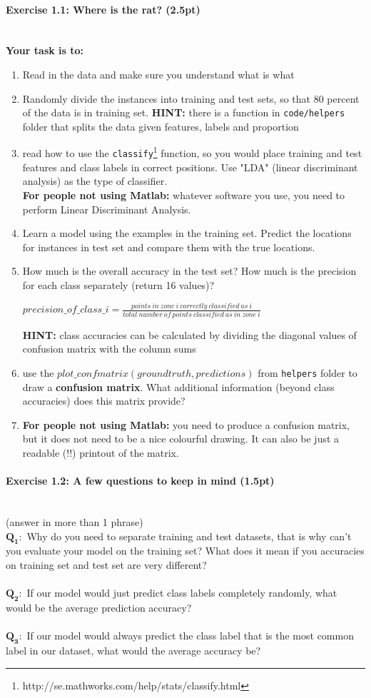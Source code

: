 \documentclass[a4paper,11pt]{article}
\newenvironment{exercise}[3]{\paragraph{Exercise #1: #2 (#3pt)}\ \\}{
\medskip}
\newcommand{\question}[2]{\setlength\parindent{0mm}\ \\$\mathbf{Q_#1:}$ #2\ \\}
\begin{document}
\begin{exercise}{1.1}{Where is the rat?}{2.5}
\textbf{Your task is to:}
\begin{enumerate}
\item Read in the data and make sure you understand what is what
\item Randomly divide the instances into training and test sets, so that 80 percent of the data is in training set. \textbf{HINT:} there is a function in \texttt{code/helpers} folder that splits the data given features, labels and proportion
\item read how to use the \texttt{classify}\footnote{http://se.mathworks.com/help/stats/classify.html} function, so you would place training and test features and class labels in correct positions. Use "LDA" (linear discriminant analysis) as the type of classifier.\\
\textbf{For people not using Matlab:} whatever software you use, you need to perform Linear Discriminant Analysis.
\item Learn a model using the examples in the training set. Predict the locations for instances in test set and compare them with the true locations.
\item How much is the overall accuracy in the test set? How much is the precision for each class separately (return 16 values)?\\
\begin{center}
$precision\_of\_class\_i=\frac{points\ in\ zone\ i\ correctly\ classified\ as\ i}{total\ number\ of\ points\ classified\ as\ in\ zone\ i}$
\end{center}
\textbf{HINT:} class accuracies can be calculated by dividing the diagonal values of confusion matrix with the column sums 
\item use the \emph{$plot\_confmatrix(groundtruth, predictions)$} from \texttt{helpers} folder to draw a \textbf{confusion matrix}. What additional information (beyond class accuracies) does this matrix provide?
\item \textbf{For people not using Matlab:} you need to produce a confusion matrix, but it does not need to be a nice colourful drawing. It can also be just a readable (!!) printout of the matrix.
\end{enumerate} 
\end{exercise}

%
%
\begin{exercise}{1.2}{A few questions to keep in mind}{1.5}
(answer in more than 1 phrase)
\question{1}{Why do you need to separate training and test datasets, that is why can't you evaluate your model on the training set? What does it mean if you accuracies on training set and test set are very different?}
\question{2}{If our model would just predict class labels completely randomly, what would be the average prediction accuracy?}
\question{3}{If our model would always predict the class label that is the most common label in our dataset, what would the average accuracy be?}
\end{exercise}
\end{document}

